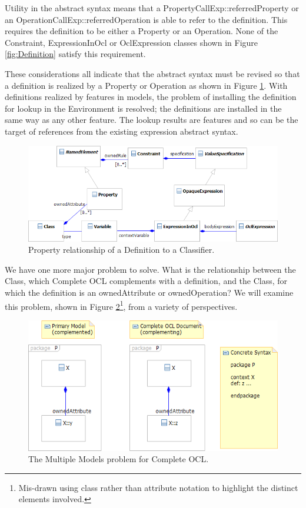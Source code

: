\documentclass{eceasst}
\begin{document}
Utility in the abstract syntax means that a PropertyCallExp::referredProperty or an OperationCallExp::referredOperation is able to refer to the definition. This requires the definition to be either a Property or an Operation. None of the Constraint, ExpressionInOcl or OclExpression classes shown in Figure \ref{fig:Definition} satisfy this requirement.

These considerations all indicate that the abstract syntax must be revised so that a definition is realized by a Property or Operation as shown in Figure \ref{fig:PropertyDefinition}. With definitions realized by features in models, the problem of installing the definition for lookup in the Environment is resolved; the definitions are installed in the same way as any other feature. The lookup results are features and so can be the target of references from the existing expression abstract syntax.

\begin{figure}
  \begin{center}
    \includegraphics[width=5.75in]{PropertyDefinition.png}
  \end{center}
  \caption{Property relationship of a Definition to a Classifier.}
  \label{fig:PropertyDefinition}
\end{figure}

We have one more major problem to solve. What is the relationship between the Class, which Complete OCL complements with a definition, and the Class, for which the definition is an owned\-Attribute or owned\-Operation? We will examine this problem, shown in Figure \ref{fig:MultipleModels}\footnote{Mis-drawn using class rather than attribute notation to highlight the distinct elements involved.}, from a variety of perspectives.

\begin{figure}
  \begin{center}
    \includegraphics[width=4.5in]{MultipleModels.png}
  \end{center}
  \caption{The Multiple Models problem for Complete OCL.}
  \label{fig:MultipleModels}
\end{figure}
\end{document}
